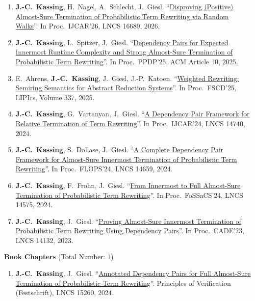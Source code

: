 \documentclass[letterpaper,11pt]{article}
\newcommand{\sectioncount}[1]{{\normalfont\normalsize\textcolor{black}{(Total Number: #1)}}}
\begin{document}
    \begin{enumerate}
      \item \textbf{J.-C.\ Kassing}, H.\ Nagel, A.\ Schlecht, J.\ Giesl. ``\href{https://doi.org/10.1007/978-3-032-32592-1_18}{Disproving (Positive) Almost-Sure Termination of Probabilistic Term Rewriting via Random Walks}''. In Proc.\ IJCAR'26, LNCS 16689, 2026.
      \item \textbf{J.-C.\ Kassing}, L.\ Spitzer, J.\ Giesl. ``\href{https://dl.acm.org/doi/10.1145/3756907.3756917}{Dependency Pairs for Expected Innermost Runtime Complexity and Strong Almost-Sure Termination of Probabilistic Term Rewriting}''. In Proc.\ PPDP'25, ACM Article 10, 2025.
      \item E.\ Ahrens, \textbf{J.-C.\ Kassing}, J.\ Giesl, J.-P.\ Katoen. ``\href{https://drops.dagstuhl.de/entities/document/10.4230/LIPIcs.FSCD.2025.6}{Weighted Rewriting: Semiring Semantics for Abstract Reduction Systems}''. In Proc.\ FSCD'25, LIPIcs, Volume 337, 2025.
      \item \textbf{J.-C.\ Kassing}, G.\ Vartanyan, J.\ Giesl. ``\href{https://link.springer.com/chapter/10.1007/978-3-031-63501-4_19}{A Dependency Pair Framework for Relative Termination of Term Rewriting}''. In Proc.\ IJCAR'24, LNCS 14740, 2024.
      \item \textbf{J.-C.\ Kassing}, S.\ Dollase, J.\ Giesl. ``\href{https://link.springer.com/chapter/10.1007/978-981-97-2300-3_4}{A Complete Dependency Pair Framework for Almost-Sure Innermost Termination of Probabilistic Term Rewriting}''. In Proc.\ FLOPS'24, LNCS 14659, 2024.
      \item \textbf{J.-C.\ Kassing}, F.\ Frohn, J.\ Giesl. ``\href{https://link.springer.com/chapter/10.1007/978-3-031-57231-9_10}{From Innermost to Full Almost-Sure Termination of Probabilistic Term Rewriting}''. In Proc.\ FoSSaCS'24, LNCS 14575, 2024.
      \item \textbf{J.-C.\ Kassing}, J.\ Giesl. ``\href{https://link.springer.com/chapter/10.1007/978-3-031-38499-8_20}{Proving Almost-Sure Innermost Termination of Probabilistic Term Rewriting Using Dependency Pairs}''. In Proc.\ CADE'23, LNCS 14132, 2023.
    \end{enumerate}
    \item \textbf{Book Chapters} \sectioncount{1}
    \begin{enumerate}
      \item \textbf{J.-C.\ Kassing}, J.\ Giesl. ``\href{https://link.springer.com/chapter/10.1007/978-3-031-75783-9_14}{Annotated Dependency Pairs for Full Almost-Sure Termination of Probabilistic Term Rewriting}''. Principles of Verification (Festschrift), LNCS 15260, 2024.
    \end{enumerate}
\end{document}
